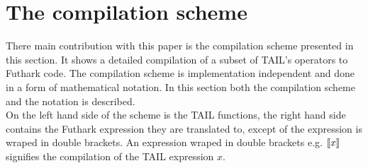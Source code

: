 \documentclass[11pt]{article}
\begin{document}





\section{The compilation scheme}

There main contribution with this paper is the compilation scheme presented in this section. It shows a detailed compilation of a subset of TAIL's operators to Futhark code. 
The compilation scheme is implementation independent and done in a form of mathematical notation. 
In this section both the compilation scheme and the notation is described. \\

On the left hand side of the scheme is the TAIL functions, the right hand side contains the Futhark expression they are translated to,
except of the expression is wraped in double brackets.
An expression wraped in double brackets e.g. $\llbracket x \rrbracket$ signifies the compilation of the TAIL expression $x$.\\
\end{document}
